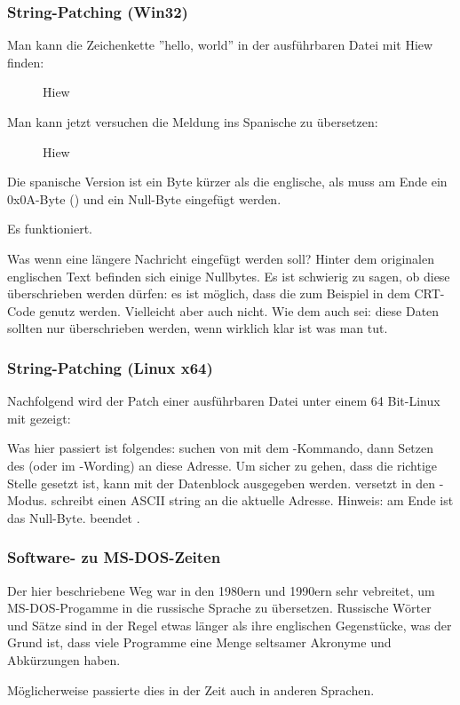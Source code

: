 \subsubsection{String-Patching (Win32)}

Man kann die Zeichenkette ''hello, world'' in der ausführbaren Datei mit Hiew finden:

\begin{figure}[H]
\centering
{}
\caption{Hiew}
\label{}
\end{figure}

Man kann jetzt versuchen die Meldung ins Spanische zu übersetzen:

\begin{figure}[H]
\centering
{}
\caption{Hiew}
\label{}
\end{figure}

Die spanische Version ist ein Byte kürzer als die englische, als muss am Ende ein 0x0A-Byte () und ein Null-Byte eingefügt werden.

Es funktioniert.

Was wenn eine längere Nachricht eingefügt werden soll?
Hinter dem originalen englischen Text befinden sich einige Nullbytes.
Es ist schwierig zu sagen, ob diese überschrieben werden dürfen: es ist möglich, dass die zum Beispiel in dem \ac{CRT}-Code genutz werden. Vielleicht aber auch nicht.
Wie dem auch sei: diese Daten sollten nur überschrieben werden, wenn wirklich klar ist was man tut.

\subsubsection{String-Patching (Linux x64)}

\myindex{\radare}
Nachfolgend wird der Patch einer ausführbaren Datei unter einem 64 Bit-Linux mit \radare{} gezeigt:



Was hier passiert ist folgendes: suchen von  mit dem \TT{/}-Kommando,
dann Setzen des  (oder  im \radare{}-Wording) an diese Adresse.
Um sicher zu gehen, dass die richtige Stelle gesetzt ist, kann mit  der Datenblock ausgegeben werden.
 versetzt \radare{} in den -Modus.
 schreibt einen ASCII string an die aktuelle Adresse.
Hinweis:  am Ende ist das Null-Byte.
 beendet \radare{}.

\subsubsection{Software- zu MS-DOS-Zeiten}

Der hier beschriebene Weg war in den 1980ern und  1990ern sehr vebreitet, um MS-DOS-Progamme in die russische Sprache zu übersetzen.
Russische Wörter und Sätze sind in der Regel etwas länger als ihre englischen Gegenstücke, was der Grund ist, dass
viele  Programme eine Menge seltsamer Akronyme und Abkürzungen haben.

Möglicherweise passierte dies in der Zeit auch in anderen Sprachen.
